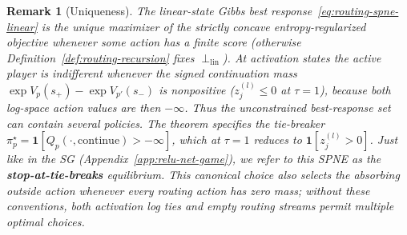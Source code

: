 \documentclass[twoside]{article}
\newcommand{\1}{\mathbf{1}}
\newtheorem{remark}{Remark}
\begin{document}
\begin{remark}[Uniqueness]\label{rem:routing-spne-uniqueness}
The linear-state Gibbs best response~\eqref{eq:routing-spne-linear} is the unique maximizer of the
strictly concave entropy-regularized objective whenever some action has a finite score (otherwise
Definition~\ref{def:routing-recursion} fixes $\perp_{\mathrm{lin}}$). At activation states the active player is indifferent whenever the signed continuation mass $\exp V_p(s_+) - \exp V_{p'}(s_-)$ is nonpositive ($z_j^{(l)}\leq0$ at $\tau=1$), because both log-space action values are then $-\infty$. Thus the unconstrained best-response set can contain several policies. The theorem specifies the
tie-breaker $\pi_p^\star = \1[Q_p(\cdot,\mathrm{continue}) > -\infty]$, which at $\tau=1$ reduces
to $\1[z_j^{(l)} > 0]$. Just like in the \ac{SG} (Appendix~\ref{app:relu-net-game}), we refer to
this SPNE as the \textbf{stop-at-tie-breaks} equilibrium. This canonical choice also selects the absorbing outside action whenever every routing action has zero mass; without these conventions, both activation log ties and empty routing streams permit multiple optimal choices.
\end{remark}
\end{document}
